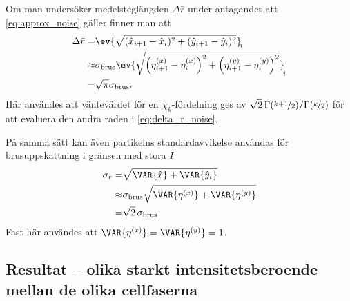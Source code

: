 Om man undersöker medelsteglängden $\Delta{\bar{r}}$ under antagandet att \eqref{eq:approx_noise} gäller finner man att
\begin{equation}\label{eq:delta_r_noise}
\begin{aligned}
\Delta{\bar{r}} =& 
\ev{\sqrt{ (\hat{x}_{i+1}-\hat{x}_{i})^2 + (\hat{y}_{i+1}-\hat{y}_{i})^2 } }_{\!i}
\\
\approx& 
\sigma_\text{brus} \ev{ \sqrt{ \left(\eta^{(x)}_{i+1} - \eta^{(x)}_{i}\right)^2 + \left(\eta^{(y)}_{i+1}-\eta^{(y)}_{i}\right)^2} }_{\!i} 
\\
=&\sqrt{\pi} \sigma_\text{brus}.
\end{aligned}
\end{equation}
Här användes att väntevärdet för en $\chi_k$-fördelning ges av
$\sqrt{2}\,\Gamma(\nicefrac{k+1}{2})/\Gamma(\nicefrac{k}{2})$ \cite{wiki:chi-distribution}
för att evaluera den andra raden i \eqref{eq:delta_r_noise}.\footnotemark{}

På samma sätt kan även partikelns standardavvikelse användas för brusuppskattning i gränsen med stora $I$
\begin{equation}\label{eq:sigma_r_noise}
\begin{aligned}
\sigma_r =& 
\sqrt{\VAR{\hat{x}} + \VAR{\hat{y}_{i}} }\\
\approx& \sigma_\text{brus} \sqrt{\VAR{\eta^{(x)}} + \VAR{\eta^{(y)}} }\\
=&\sqrt{2}\,\sigma_\text{brus}.
\end{aligned}
\end{equation}
Fast här användes att $\VAR{\eta^{(x)}} = \VAR{\eta^{(y)}} =1$.


\subsection{Resultat -- olika starkt intensitetsberoende mellan de olika cellfaserna}\label{sec:resultat-storleksberoende}

